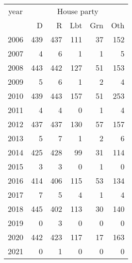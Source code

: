 \footnotesize\begin{tabular}[t]{lrrrrr}
\toprule
\multicolumn{1}{c}{year} & \multicolumn{5}{c}{House party} \\
\cmidrule(l{3pt}r{3pt}){1-1} \cmidrule(l{3pt}r{3pt}){2-6}
  & D & R & Lbt & Grn & Oth\\
\midrule
2006 & 439 & 437 & 111 & 37 & 152\\
2007 & 4 & 6 & 1 & 1 & 5\\
2008 & 443 & 442 & 127 & 51 & 153\\
2009 & 5 & 6 & 1 & 2 & 4\\
2010 & 439 & 443 & 157 & 51 & 253\\
2011 & 4 & 4 & 0 & 1 & 4\\
2012 & 437 & 437 & 130 & 57 & 157\\
2013 & 5 & 7 & 1 & 2 & 6\\
2014 & 425 & 428 & 99 & 31 & 114\\
2015 & 3 & 3 & 0 & 1 & 0\\
2016 & 414 & 406 & 115 & 53 & 134\\
2017 & 7 & 5 & 4 & 1 & 4\\
2018 & 445 & 402 & 113 & 30 & 140\\
2019 & 0 & 3 & 0 & 0 & 0\\
2020 & 442 & 423 & 117 & 17 & 163\\
2021 & 0 & 1 & 0 & 0 & 0\\
\bottomrule
\end{tabular}
